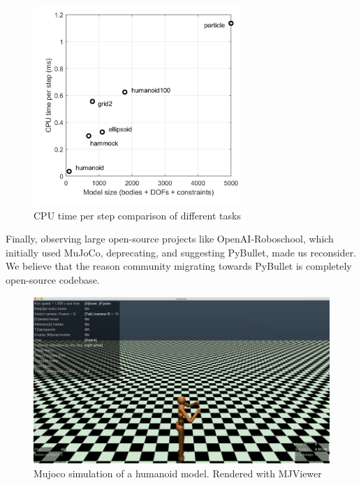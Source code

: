 \begin{figure}[htbp]
    \centering
      \includegraphics[width=0.7\textwidth]{figures/MujocoCPU1}
    \caption{CPU time per step comparison of different tasks \cite{Erez2015}}
    \label{fig:mujococpu}
\end{figure}

Finally, observing large open-source projects like OpenAI-Roboschool, which initially used MuJoCo, deprecating, and suggesting PyBullet, made us reconsider. We believe that the reason community migrating towards PyBullet is completely open-source codebase. 

\begin{figure}[htbp]
    \centering
      \includegraphics[width=1.\textwidth]{figures/MujocoHuman1}
    \caption{Mujoco simulation of a humanoid model. Rendered with MJViewer}
    \label{fig:mujocohuman}
\end{figure}